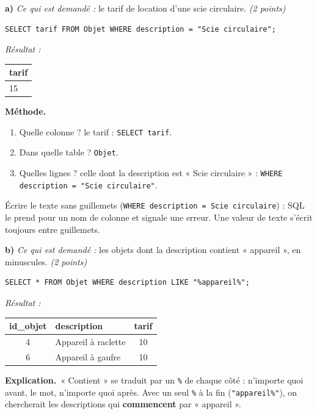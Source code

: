 \documentclass[11pt, a4paper]{exam}
\newcommand{\code}[1]{\texttt{#1}}
\newcommand{\rappel}[1]{\noindent\textit{Ce qui est demandé :} #1\par\smallskip}
\newcommand{\methode}{\noindent\textbf{Méthode.}\ }
\newcommand{\explication}{\noindent\textbf{Explication.}\ }
\newcommand{\resultat}[1]{\par\smallskip\noindent\textit{Résultat :}\par\nopagebreak\begin{center}\small #1\end{center}}
\begin{document}
\textbf{a)} \rappel{le tarif de location d'une scie circulaire. \hfill\textit{(2 points)}}
\begin{reponse}
\begin{lstlisting}
SELECT tarif FROM Objet WHERE description = "Scie circulaire";
\end{lstlisting}
\end{reponse}
\resultat{\begin{tabular}{|l|}\hline tarif \\\hline 15 \\\hline\end{tabular}}
\methode
\begin{enumerate}
\item Quelle colonne ? le tarif : \code{SELECT tarif}.
\item Dans quelle table ? \code{Objet}.
\item Quelles lignes ? celle dont la description est « Scie circulaire » : \code{WHERE description = "Scie circulaire"}.
\end{enumerate}

\begin{erreur}
Écrire le texte sans guillemets (\code{WHERE description = Scie circulaire}) : SQL le prend pour un nom de colonne et signale une erreur. Une valeur de texte s'écrit toujours entre guillemets.
\end{erreur}

\textbf{b)} \rappel{les objets dont la description contient « appareil », en minuscules. \hfill\textit{(2 points)}}
\begin{reponse}
\begin{lstlisting}
SELECT * FROM Objet WHERE description LIKE "%appareil%";
\end{lstlisting}
\end{reponse}
\resultat{\begin{tabular}{|c|l|c|}\hline id\_objet & description & tarif \\\hline 4 & Appareil à raclette & 10 \\ 6 & Appareil à gaufre & 10 \\\hline\end{tabular}}
\explication « Contient » se traduit par un \code{\%} de chaque côté : n'importe quoi avant, le mot, n'importe quoi après. Avec un seul \code{\%} à la fin (\code{"appareil\%"}), on chercherait les descriptions qui \textbf{commencent} par « appareil ».
\end{document}

